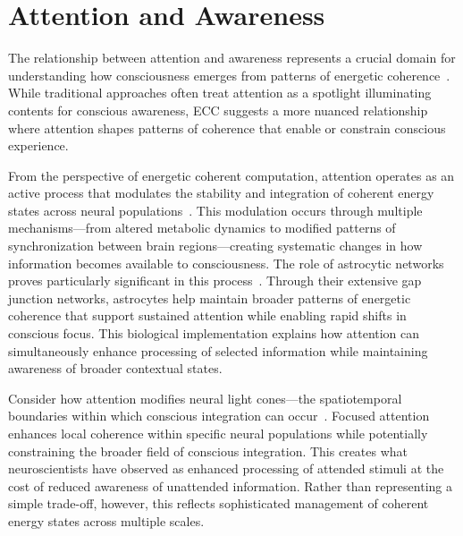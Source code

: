 \section{Attention and Awareness}

The relationship between attention and awareness represents a crucial domain for understanding how consciousness emerges from patterns of energetic coherence~\cite{vanBoxtel2010}. While traditional approaches often treat attention as a spotlight illuminating contents for conscious awareness, ECC suggests a more nuanced relationship where attention shapes patterns of coherence that enable or constrain conscious experience.

From the perspective of energetic coherent computation, attention operates as an active process that modulates the stability and integration of coherent energy states across neural populations~\cite{pinotsis2023cytoelectric}. This modulation occurs through multiple mechanisms—from altered metabolic dynamics to modified patterns of synchronization between brain regions—creating systematic changes in how information becomes available to consciousness. The role of astrocytic networks proves particularly significant in this process~\cite{pellerin2004neuroenergetics}. Through their extensive gap junction networks, astrocytes help maintain broader patterns of energetic coherence that support sustained attention while enabling rapid shifts in conscious focus. This biological implementation explains how attention can simultaneously enhance processing of selected information while maintaining awareness of broader contextual states.

Consider how attention modifies neural light cones—the spatiotemporal boundaries within which conscious integration can occur~\cite{hales2022electromagnetism}. Focused attention enhances local coherence within specific neural populations while potentially constraining the broader field of conscious integration. This creates what neuroscientists have observed as enhanced processing of attended stimuli at the cost of reduced awareness of unattended information. Rather than representing a simple trade-off, however, this reflects sophisticated management of coherent energy states across multiple scales.

